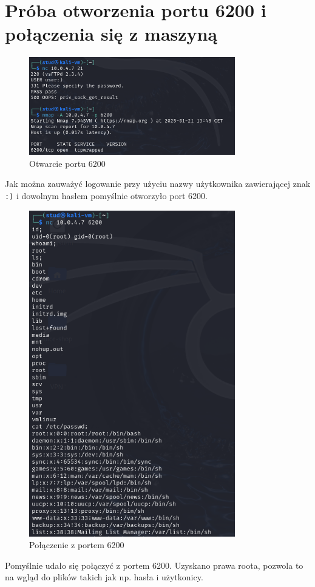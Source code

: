 \documentclass{article}
\begin{document}
\section*{Próba otworzenia portu 6200 i połączenia się z maszyną}
\begin{figure}[H]
    \centering
    \includegraphics[width=0.8\textwidth]{otwarcie_portow_6200.png}
    \caption{Otwarcie portu 6200}
\end{figure}
Jak można zauważyć logowanie przy użyciu nazwy użytkownika zawierającej znak \texttt{:)} i dowolnym hasłem pomyślnie otworzyło port 6200.
\begin{figure}[H]
    \centering
    \includegraphics[width=0.8\textwidth]{nc_6200.png}
    \caption{Połączenie z portem 6200}
\end{figure}
Pomyślnie udało się połączyć z portem 6200. Uzyskano prawa roota, pozwola to na wgląd do plików takich jak np. hasła i użytkonicy.
\end{document}
